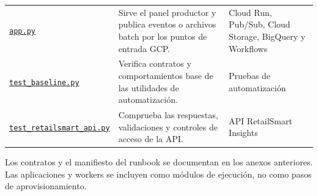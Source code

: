 \documentclass[11pt]{article}
\begin{document}
\begin{longtable}{@{}>{\raggedright\arraybackslash}p{}>{\raggedright\arraybackslash}p{}>{\raggedright\arraybackslash}p{}@{}}
\href{https://github.com/Codenid/lumina-retail-data-platform/blob/main/implementation/soluciones/productor-datos/app.py}{\texttt{app.py}} & Sirve el panel productor y publica eventos o archivos batch por los puntos de entrada GCP. & Cloud Run, Pub/Sub, Cloud Storage, BigQuery y Workflows \\
\href{https://github.com/Codenid/lumina-retail-data-platform/blob/main/implementation/tests/test_baseline.py}{\texttt{test\_\allowbreak{}baseline.py}} & Verifica contratos y comportamientos base de las utilidades de automatización. & Pruebas de automatización \\
\href{https://github.com/Codenid/lumina-retail-data-platform/blob/main/implementation/tests/test_retailsmart_api.py}{\texttt{test\_\allowbreak{}retailsmart\_\allowbreak{}api.py}} & Comprueba las respuestas, validaciones y controles de acceso de la API. & API RetailSmart Insights \\
\bottomrule
\end{longtable}
\endgroup

Los contratos y el manifiesto del runbook se documentan en los anexos anteriores. Las aplicaciones y workers se incluyen como módulos de ejecución, no como pasos de aprovisionamiento.
\end{document}
